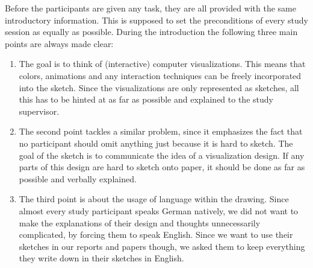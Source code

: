 Before the participants are given any task, they are all provided with the same introductory information. This is supposed to set the preconditions of every study session as equally as possible. During the introduction the following three main points are always made clear:
\begin{enumerate}
	\item The goal is to think of (interactive) computer visualizations. This means that colors, animations and any interaction techniques can be freely incorporated into the sketch. Since the visualizations are only represented as sketches, all this has to be hinted at as far as possible and explained to the study supervisor.
	
	\item The second point tackles a similar problem, since it emphasizes the fact that no participant should omit anything just because it is hard to sketch. The goal of the sketch is to communicate the idea of a visualization design. If any parts of this design are hard to sketch onto paper, it should be done as far as possible and verbally explained.
	
	\item The third point is about the usage of language within the drawing. Since almost every study participant speaks German natively, we did not want to make the explanations of their design and thoughts unnecessarily complicated, by forcing them to speak English. Since we want to use their sketches in our reports and papers though, we asked them to keep everything they write down in their sketches in English. 
	
\end{enumerate} 











